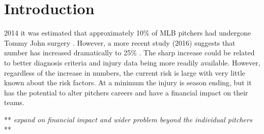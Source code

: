\section {Introduction}
 2014 it was estimated that approximately 10\% of MLB pitchers had undergone Tommy John surgery \cite{Erickson2014}. However, a more recent study (2016) suggests that number has increased dramatically to 25\% \cite{Keller2016}. The sharp increase could be related to better diagnosis criteria and injury data being more readily available. However, regardless of the increase in numbers, the current risk is large with very little known about the risk factors. At a minimum the injury is season ending, but it has the potential to alter pitchers careers and have a financial impact on their teams.


** \emph{expand on financial impact and wider problem beyond the individual pitchers} **
